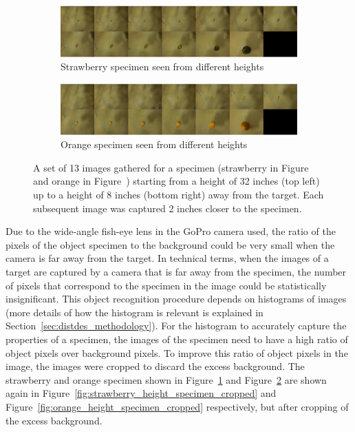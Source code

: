 \documentclass {udthesis}
\begin{document}
\begin{figure}
  \centering
  \begin{subfigure}[]{\textwidth}
      \includegraphics[width=\textwidth]{strawberry_distance_montage.eps}
      \caption{Strawberry specimen seen from different heights}
      \label{fig:strawberry_height_specimen}
  \end{subfigure}
  \begin{subfigure}[]{\textwidth}
      \includegraphics[width=\textwidth]{orange_distance_montage.eps}
      \caption{Orange specimen seen from different heights}
      \label{fig:orange_height_specimen}
  \end{subfigure}
\caption[Set of images collected for each specimen from different heights]{A set of 13 images gathered for a specimen (strawberry in Figure~ and orange in Figure~) starting from a height of 32 inches (top left) up to a height of 8 inches (bottom right) away from the target.
Each subsequent image was captured 2 inches closer to the specimen.}
\label{fig:height_specimen}
\end{figure}	
%
Due to the wide-angle fish-eye lens in the GoPro camera used, the ratio of the pixels of the object specimen to the background could be very small when the camera is far away from the target. In technical terms, when the images of a target are captured by a camera that is far away from the specimen, the number of pixels that correspond to the specimen in the image could be statistically insignificant. This object recognition procedure depends on histograms of images (more details of how the histogram is relevant is explained in Section~\ref{sec:distdes_methodology}). 
For the histogram to accurately capture the properties of a specimen, the images of the specimen need to have a high ratio of object pixels over background pixels. To improve this ratio of object pixels in the image, the images were cropped to discard the excess background. The strawberry and orange specimen shown in Figure~\ref{fig:strawberry_height_specimen} and Figure~\ref{fig:orange_height_specimen} are shown again in Figure~\ref{fig:strawberry_height_specimen_cropped} and 
Figure~\ref{fig:orange_height_specimen_cropped} respectively, but after cropping of the excess background.
\end{document}
